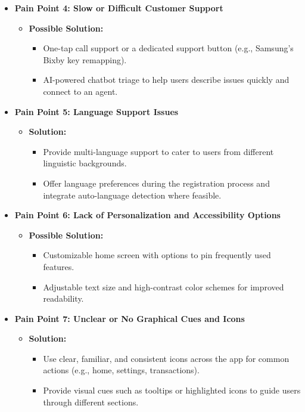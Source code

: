 \documentclass[a4paper,12pt]{report}
\begin{document}
\begin{itemize}
  \item \textbf{Pain Point 4: Slow or Difficult Customer Support}
        \begin{itemize}
          \item \textbf{Possible Solution:}
                \begin{itemize}
                  \item One-tap call support or a dedicated support button (e.g., Samsung's Bixby key remapping).
                  \item AI-powered chatbot triage to help users describe issues quickly and connect to an agent.
                \end{itemize}
        \end{itemize}


  \item \textbf{Pain Point 5: Language Support Issues}
        \begin{itemize}
          \item \textbf{Solution:}
                \begin{itemize}
                  \item Provide multi-language support to cater to users from different linguistic backgrounds.
                  \item Offer language preferences during the registration process and integrate auto-language detection where feasible.
                \end{itemize}
        \end{itemize}


  \item \textbf{Pain Point 6: Lack of Personalization and Accessibility Options}
        \begin{itemize}
          \item \textbf{Possible Solution:}
                \begin{itemize}
                  \item Customizable home screen with options to pin frequently used features.
                  \item Adjustable text size and high-contrast color schemes for improved readability.
                \end{itemize}
        \end{itemize}

  \item \textbf{Pain Point 7: Unclear or No Graphical Cues and Icons}
        \begin{itemize}
          \item \textbf{Solution:}
                \begin{itemize}
                  \item Use clear, familiar, and consistent icons across the app for common actions (e.g., home, settings, transactions).
                  \item Provide visual cues such as tooltips or highlighted icons to guide users through different sections.
                \end{itemize}
        \end{itemize}


\end{itemize}
\end{document}
